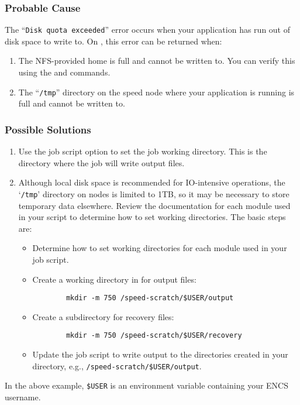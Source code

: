 \subsubsection{Probable Cause}
The ``\texttt{Disk quota exceeded}'' error occurs when your application has
run out of disk space to write to. On , this error can be returned when:
\begin{enumerate}
	\item The NFS-provided home is full and cannot be written to.
	You can verify this using the  and  commands.
	\item The ``\texttt{/tmp}'' directory on the speed node where your application is running is full and cannot be written to.
\end{enumerate}

\subsubsection{Possible Solutions}
\begin{enumerate}
	\item Use the  job script option to set the job working directory.
	This is the directory where the job will write output files.

 	\item Although local disk space is recommended for IO-intensive operations, the 
 	`\texttt{/tmp}' directory on  nodes is limited to 1TB, so it may be necessary 
	to store temporary data elsewhere. Review the documentation for each module
	used in your script to determine how to set working directories.
	The basic steps are:
	\begin{itemize}
	\item
	Determine how to set working directories for each module used in your job script.
	\item
	Create a working directory in  for output files:
	\begin{verbatim}
		mkdir -m 750 /speed-scratch/$USER/output
	\end{verbatim}
	\item
	Create a subdirectory for recovery files:
	\begin{verbatim}
		mkdir -m 750 /speed-scratch/$USER/recovery
	\end{verbatim}
	\item
	Update the job script to write output to the directories created in your  directory,
	e.g., \verb!/speed-scratch/$USER/output!.
	\end{itemize}
\end{enumerate}
\noindent In the above example, \verb!$USER! is an environment variable containing your ENCS username.

